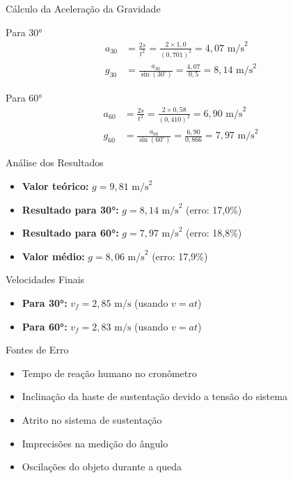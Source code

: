 \documentclass[12pt]{beamer}
\begin{document}
\begin{frame}{Cálculo da Aceleração da Gravidade}
    \begin{block}{Para 30°}
        \small
        \begin{align}
            a_{30} & = \frac{2s}{t^2} = \frac{2 \times 1,0}{(0,701)^2} = 4,07 \text{ m/s}^2  \\
            g_{30} & = \frac{a_{30}}{\sin(30^\circ)} = \frac{4,07}{0,5} = 8,14 \text{ m/s}^2
        \end{align}
    \end{block}

    \begin{block}{Para 60°}
        \small
        \begin{align}
            a_{60} & = \frac{2s}{t^2} = \frac{2 \times 0,58}{(0,410)^2} = 6,90 \text{ m/s}^2   \\
            g_{60} & = \frac{a_{60}}{\sin(60^\circ)} = \frac{6,90}{0,866} = 7,97 \text{ m/s}^2
        \end{align}
    \end{block}

\end{frame}

\begin{frame}{Análise dos Resultados}
    \begin{itemize}
        \item \textbf{Valor teórico:} $g = 9,81 \text{ m/s}^2$
        \item \textbf{Resultado para 30°:} $g = 8,14 \text{ m/s}^2$ (erro: 17,0\%)
        \item \textbf{Resultado para 60°:} $g = 7,97 \text{ m/s}^2$ (erro: 18,8\%)
        \item \textbf{Valor médio:} $g = 8,06 \text{ m/s}^2$ (erro: 17,9\%)
    \end{itemize}

    \begin{block}{Velocidades Finais}
        \begin{itemize}
            \item \textbf{Para 30°:} $v_f = 2,85 \text{ m/s}$ (usando $v = at$)
            \item \textbf{Para 60°:} $v_f = 2,83 \text{ m/s}$ (usando $v = at$)
        \end{itemize}
    \end{block}

    \begin{block}{Fontes de Erro}
        \begin{itemize}
            \item Tempo de reação humano no cronômetro
            \item Inclinação da haste de sustentação devido a tensão do sistema
            \item Atrito no sistema de sustentação
            \item Imprecisões na medição do ângulo
            \item Oscilações do objeto durante a queda
        \end{itemize}
    \end{block}
\end{frame}
\end{document}
